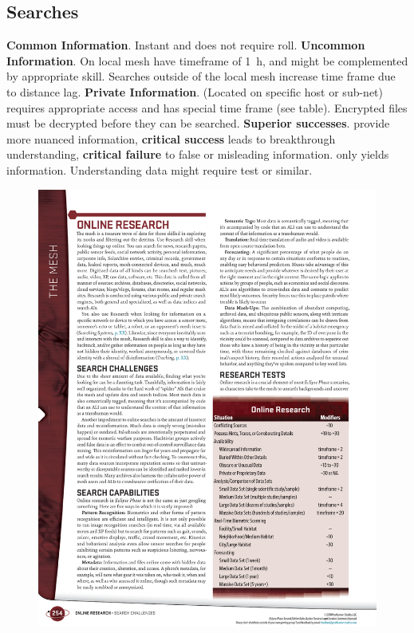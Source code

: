 \subsection*{Searches}

\begin{itemize}
   \itembox \textbf{Common Information}. Instant and does not require roll.
   \itembox \textbf{Uncommon Information}. On local mesh have timeframe of \SI{1}{h}, and might be complemented by appropriate  skill. Searches outside of the local mesh increase time frame due to distance lag.
   \itembox \textbf{Private Information}. (Located on specific host or sub-net) requires appropriate access and has special time frame (see table). Encrypted files must be decrypted before they can be searched.
   \itembox \textbf{Superior successes}. provide more nuanced information, \textbf{critical success} leads to breakthrough understanding, \textbf{critical failure} to false or misleading information.
   \itembox {} only yields information. Understanding data might require  test or similar.
\end{itemize}


\begin{figure}[htbp!]%
   \includegraphics[scale=0.9]{gfx/mesh-research}%
\end{figure}%


